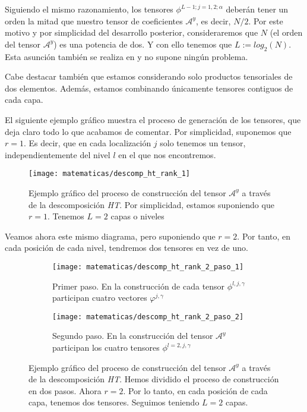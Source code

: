 Siguiendo el mismo razonamiento, los tensores $\phi^{L-1; j = 1, 2; \alpha}$ deberán tener un orden la mitad que nuestro tensor de coeficientes $\mathcal{A}^y$, es decir, $N / 2$. Por este motivo y por simplicidad del desarrollo posterior, consideraremos que $N$ (el orden del tensor $\mathcal{A}^y$) es una potencia de dos. Y con ello tenemos que $L := log_2(N)$. Esta asunción también se realiza en \cite{matematicas:descomposicion_ht} y no supone ningún problema.

Cabe destacar también que estamos considerando solo productos tensoriales de dos elementos. Además, estamos combinando únicamente tensores contiguos de cada capa.

El siguiente ejemplo gráfico muestra el proceso de generación de los tensores, que deja claro todo lo que acabamos de comentar. Por simplicidad, suponemos que $r = 1$. Es decir, que en cada localización $j$ solo tenemos un tensor, independientemente del nivel $l$ en el que nos encontremos.

\begin{figure}[H]
	\centering
	\texttt{[image: matematicas/descomp\_ht\_rank\_1]}
	\caption{Ejemplo gráfico del proceso de construcción del tensor $\mathcal{A}^y$ a través de la descomposición \textit{HT}. Por simplicidad, estamos suponiendo que $r = 1$. Tenemos $L = 2$ capas o niveles}
	\label{img:diagrama_ht_simple}
\end{figure}

Veamos ahora este mismo diagrama, pero suponiendo que $r = 2$. Por tanto, en cada posición de cada nivel, tendremos dos tensores en vez de uno.

\begin{figure}[H]
	\centering
	\ajustarsubcaptions
	\begin{subfigure}{.5\textwidth}
		\centering
		\texttt{[image: matematicas/descomp\_ht\_rank\_2\_paso\_1]}
		\caption{Primer paso. En la construcción de cada tensor $\phi^{l, j, \gamma}$ participan cuatro vectores $\varphi^{j, \gamma}$}
	\end{subfigure}%
	\begin{subfigure}{.5\textwidth}
		\centering
		\texttt{[image: matematicas/descomp\_ht\_rank\_2\_paso\_2]}
		\caption{Segundo paso. En la construcción del tensor $\mathcal{A}^y$ participan los cuatro tensores $\phi^{l=2, j, \gamma}$}
	\end{subfigure}
	\caption{Ejemplo gráfico del proceso de construcción del tensor $\mathcal{A}^y$ a través de la descomposición \textit{HT}. Hemos dividido el proceso de construcción en dos pasos. Ahora $r = 2$. Por lo tanto, en cada posición de cada capa, tenemos dos tensores. Seguimos teniendo $L = 2$ capas. }
	\label{img:diagrama_ht_complejo}
\end{figure}

